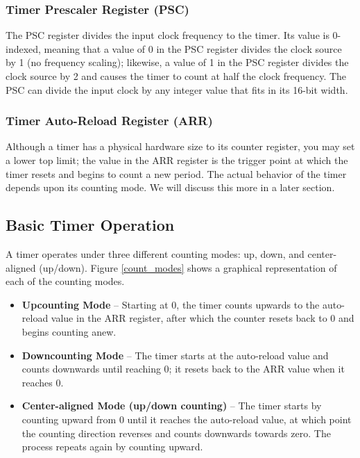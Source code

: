 \documentclass[openany,11pt,fleqn]{book} %
\begin{document}
    \subsubsection{Timer Prescaler Register (PSC)}
    The PSC register divides the input clock frequency to the timer. Its value is 0-indexed, meaning that a value of 0 in the PSC register divides the clock source by 1 (no frequency scaling); likewise, a value of 1 in the PSC register divides the clock source by 2 and causes the timer to count at half the clock frequency. The PSC can divide the input clock by any integer value that fits in its 16-bit width.  
    \subsubsection{Timer Auto-Reload Register (ARR)}
     Although a timer has a physical hardware size to its counter register, you may set a lower top limit; the value in the ARR register is the trigger point at which the timer resets and begins to count a new period. The actual behavior of the timer depends upon its counting mode. We will discuss this more in a later section. 

    
    \subsection{\color{orange}Basic Timer Operation}
    
    A timer operates under three different counting modes: up, down, and center-aligned (up/down). Figure \ref{count_modes} shows a graphical representation of each of the counting modes.  
    
    \begin{itemize}
        \item \textbf{Upcounting Mode} --  Starting at 0, the timer counts upwards to the auto-reload value in the ARR register, after which the counter resets back to 0 and begins counting anew. 
        \item \textbf{Downcounting Mode} -- The timer starts at the auto-reload value and counts downwards until reaching 0; it resets back to the ARR value when it reaches 0.
        \item \textbf{Center-aligned Mode (up/down counting)} -- The timer starts by counting upward from 0 until it reaches the auto-reload value, at which point the counting direction reverses and counts downwards towards zero. The process repeats again by counting upward.
    \end{itemize}
\end{document}
